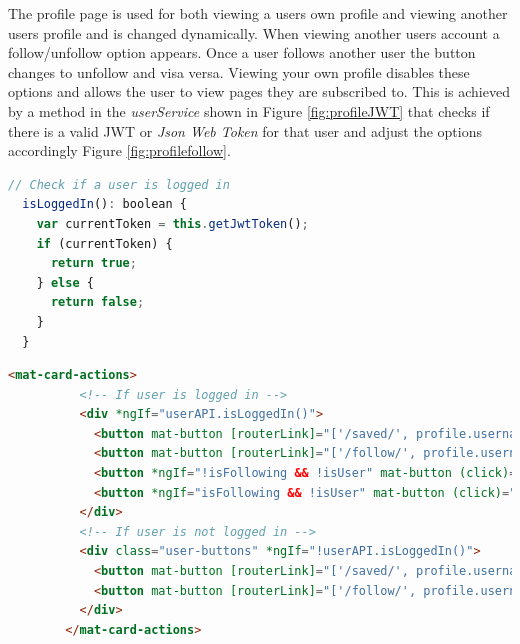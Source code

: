 The profile page is used for both viewing a users own profile and viewing another users profile and is changed dynamically. When viewing another users account a follow/unfollow option appears. Once a user follows another user the button changes to unfollow and visa versa. Viewing your own profile disables these options and allows the user to view pages they are subscribed to. This is achieved by a method in the \textit{userService} shown in Figure \ref{fig:profileJWT} that checks if there is a valid JWT or \textit{Json Web Token} for that user and adjust the options accordingly Figure \ref{fig:profilefollow}.

\begin{lstlisting}[language=JAVASCRIPT,caption={Validate JWT},captionpos=b,label={fig:profileJWT}]
  // Check if a user is logged in
  isLoggedIn(): boolean {
    var currentToken = this.getJwtToken();
    if (currentToken) {
      return true;
    } else {
      return false;
    }
  }
  \end{lstlisting}
\begin{lstlisting}[language=HTML,caption={Follow / Unfollow option},captionpos=b,label={fig:profilefollow}]
       <mat-card-actions>
          <!-- If user is logged in -->
          <div *ngIf="userAPI.isLoggedIn()">
            <button mat-button [routerLink]="['/saved/', profile.username]">SUBSCRIBED POSTS</button>
            <button mat-button [routerLink]="['/follow/', profile.username]">FRIENDS</button>
            <button *ngIf="!isFollowing && !isUser" mat-button (click)="follow(profile._id)">FOLLOW</button>
            <button *ngIf="isFollowing && !isUser" mat-button (click)="unFollow(profile._id)">UNFOLLOW</button>
          </div>
          <!-- If user is not logged in -->
          <div class="user-buttons" *ngIf="!userAPI.isLoggedIn()">
            <button mat-button [routerLink]="['/saved/', profile.username]">SUBSCRIBED POSTS</button>
            <button mat-button [routerLink]="['/follow/', profile.username]">FOLLOW STUFF</button>
          </div>
        </mat-card-actions>
\end{lstlisting}

